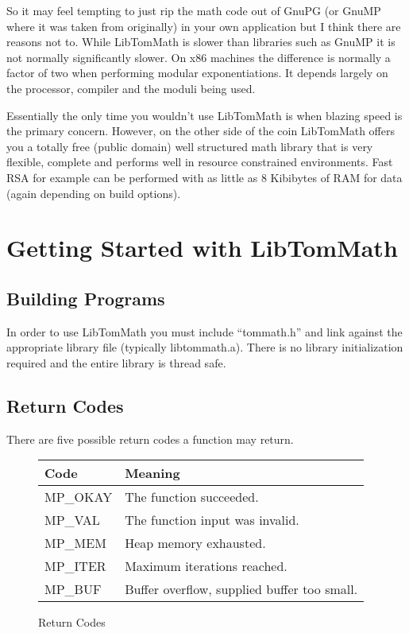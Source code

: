 \documentclass[synpaper]{book}
\begin{document}
So it may feel tempting to just rip the math code out of GnuPG (or GnuMP where it was taken from
originally) in your own application but I think there are reasons not to.  While LibTomMath is
slower than libraries such as GnuMP it is not normally significantly slower.  On x86 machines the
difference is normally a factor of two when performing modular exponentiations.  It depends largely
on the processor, compiler and the moduli being used.

Essentially the only time you wouldn't use LibTomMath is when blazing speed is the primary concern.
However, on the other side of the coin LibTomMath offers you a totally free (public domain) well
structured math library that is very flexible, complete and performs well in resource constrained
environments.  Fast RSA for example can be performed with as little as 8 Kibibytes of RAM for data
(again depending on build options).

\chapter{Getting Started with LibTomMath}
\section{Building Programs}
In order to use LibTomMath you must include ``tommath.h'' and link against the appropriate library
file (typically
libtommath.a).	There is no library initialization required and the entire library is thread safe.

\section{Return Codes}
There are five possible return codes a function may return.

\begin{figure}[h!]
  \begin{center}
    \begin{small}
      \begin{tabular}{|l|l|}
        \hline \textbf{Code} & \textbf{Meaning}                            \\
        \hline MP\_OKAY      & The function succeeded.                     \\
        \hline MP\_VAL       & The function input was invalid.             \\
        \hline MP\_MEM       & Heap memory exhausted.                      \\
        \hline MP\_ITER      & Maximum iterations reached.                 \\
        \hline MP\_BUF       & Buffer overflow, supplied buffer too small. \\
        \hline
      \end{tabular}
    \end{small}
  \end{center}
  \caption{Return Codes}
\end{figure}
\end{document}
